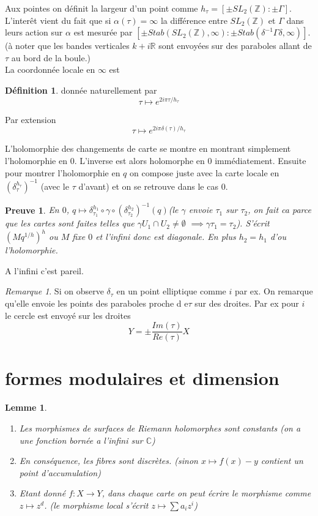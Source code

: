 \documentclass[12pt]{article}
\theoremstyle{plain}
\newtheorem{lem}[subsubsection]{Lemme}
\newtheorem{prf}{Preuve}
\theoremstyle{definition}
\newtheorem{defn}[subsubsection]{D\'efinition}
\theoremstyle{remark}
\newtheorem{rem}{Remarque}
\newcommand{\Z}{\mathbb{Z}}
\newcommand{\C}{\mathbb{C}}
\begin{document}
Aux pointes on définit la largeur d'un point comme 
$h_{\tau}=[\pm SL_2(\Z):\pm \Gamma]$. L'interêt vient du fait 
que si $\alpha(\tau)=\infty$ la différence entre $SL_2(\Z)$
et $\Gamma$ dans leurs action sur $\alpha$ est mesurée par
$[\pm Stab(SL_2(\Z), \infty):\pm Stab(\delta^{-1}\Gamma\delta, \infty)]$.
(à noter que les bandes verticales $k+i\mathbb{R}$ sont envoyées 
sur des paraboles allant de $\tau$ au bord de la boule.)\\
La coordonnée locale en $\infty$ est 
\begin{defn}
    donnée naturellement par $$\tau\mapsto e^{2i\pi\tau/h_{\tau}}$$

    Par extension $$\tau\mapsto e^{2i\pi\delta(\tau)/h_{\tau}}$$
\end{defn}

L'holomorphie des changements de carte se montre 
en montrant simplement l'holomorphie en $0$. 
L'inverse est alors holomorphe en $0$ immédiatement.
Ensuite pour montrer l'holomorphie en $q$ on compose juste
avec la carte locale en $(\delta_{\tau}^{h_{\tau}})^{-1}$
(avec le $\tau$ d'avant) et on se retrouve dans le cas $0$.
\begin{prf}
    En $0$, $q\mapsto \delta_{\tau_1}^{h_1}\circ\gamma\circ
    (\delta_{\tau_2}^{h_2})^{-1}(q)$(le $\gamma$ envoie 
    $\tau_1$ sur $\tau_2$, on fait ca parce que les cartes
    sont faites telles que $\gamma U_1\cap U_2\ne \emptyset$
    $\implies \gamma\tau_1=\tau_2$).
     S'écrit $(Mq^{1/h})^h$
    ou $M$ fixe $0$ et l'infini donc est diagonale. En plus
    $h_2=h_1$ d'ou l'holomorphie.
\end{prf}

A l'infini c'est pareil.

\begin{rem}
    Si on observe $\delta_{\tau}$ en un point elliptique
     comme $i$ par ex. On remarque qu'elle envoie les points
     des paraboles proche d e$\tau$ sur des droites. Par ex
     pour $i$ le cercle est envoyé sur les droites
     $$Y=\pm\frac{Im(\tau)}{Re(\tau)}X$$
\end{rem}

\section{formes modulaires et dimension}
\begin{lem}
    \begin{enumerate}
        \item Les morphismes de surfaces de Riemann holomorphes
        sont constants (on a une fonction bornée a l'infini
        sur $\C$)
        \item En conséquence, les fibres sont discrètes. 
        (sinon $x\mapsto f(x)-y$ contient un point d'accumulation)
        \item Etant donné $f:X\rightarrow Y$, dans chaque carte
        on peut écrire le morphisme comme $z\mapsto z^d$. 
        (le morphisme local s'écrit $z\mapsto\sum a_i z^i$)
        
    \end{enumerate}
\end{lem}
\end{document}
